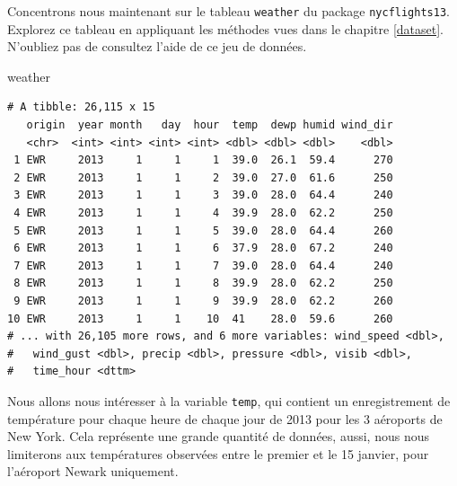 \documentclass[
  a4paper,
]{article}
\newenvironment{Shaded}{\begin{snugshade}}{\end{snugshade}}
\newcommand{\DecValTok}[1]{\textcolor[rgb]{0.69,0.50,0.00}{#1}}
\newcommand{\KeywordTok}[1]{\textcolor[rgb]{0.12,0.11,0.11}{\textbf{#1}}}
\newcommand{\NormalTok}[1]{\textcolor[rgb]{0.12,0.11,0.11}{#1}}
\newcommand{\OperatorTok}[1]{\textcolor[rgb]{0.12,0.11,0.11}{#1}}
\newcommand{\StringTok}[1]{\textcolor[rgb]{0.75,0.01,0.01}{#1}}
\begin{document}
Concentrons nous maintenant sur le tableau \texttt{weather} du package \texttt{nycflights13}. Explorez ce tableau en appliquant les méthodes vues dans le chapitre \ref{dataset}. N'oubliez pas de consultez l'aide de ce jeu de données.

\begin{Shaded}
\begin{Highlighting}[]
\NormalTok{weather}
\end{Highlighting}
\end{Shaded}

\begin{verbatim}
# A tibble: 26,115 x 15
   origin  year month   day  hour  temp  dewp humid wind_dir
   <chr>  <int> <int> <int> <int> <dbl> <dbl> <dbl>    <dbl>
 1 EWR     2013     1     1     1  39.0  26.1  59.4      270
 2 EWR     2013     1     1     2  39.0  27.0  61.6      250
 3 EWR     2013     1     1     3  39.0  28.0  64.4      240
 4 EWR     2013     1     1     4  39.9  28.0  62.2      250
 5 EWR     2013     1     1     5  39.0  28.0  64.4      260
 6 EWR     2013     1     1     6  37.9  28.0  67.2      240
 7 EWR     2013     1     1     7  39.0  28.0  64.4      240
 8 EWR     2013     1     1     8  39.9  28.0  62.2      250
 9 EWR     2013     1     1     9  39.9  28.0  62.2      260
10 EWR     2013     1     1    10  41    28.0  59.6      260
# ... with 26,105 more rows, and 6 more variables: wind_speed <dbl>,
#   wind_gust <dbl>, precip <dbl>, pressure <dbl>, visib <dbl>,
#   time_hour <dttm>
\end{verbatim}

Nous allons nous intéresser à la variable \texttt{temp}, qui contient un enregistrement de température pour chaque heure de chaque jour de 2013 pour les 3 aéroports de New York. Cela représente une grande quantité de données, aussi, nous nous limiterons aux températures observées entre le premier et le 15 janvier, pour l'aéroport Newark uniquement.

\begin{Shaded}
\end{Shaded}
\end{document}
